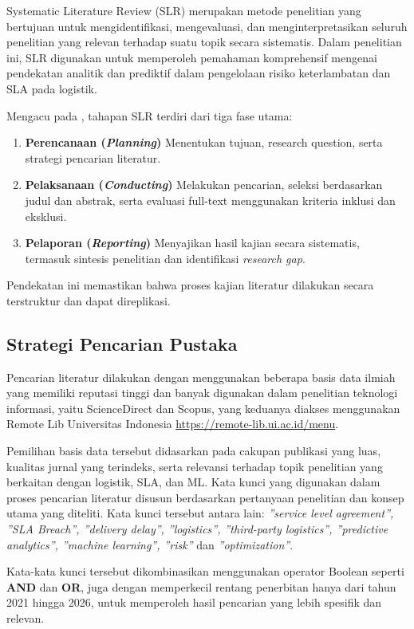 Systematic Literature Review (SLR) merupakan metode penelitian yang bertujuan untuk mengidentifikasi, mengevaluasi, dan menginterpretasikan seluruh penelitian yang relevan terhadap suatu topik secara sistematis. Dalam penelitian ini, SLR digunakan untuk memperoleh pemahaman komprehensif mengenai pendekatan analitik dan prediktif dalam pengelolaan risiko keterlambatan dan SLA pada logistik.

Mengacu pada \citep{kitchenham}, tahapan SLR terdiri dari tiga fase utama: 
\begin{enumerate}
    \item \textbf{Perencanaan (\textit{Planning})} Menentukan tujuan, research question, serta strategi pencarian literatur.
    \item \textbf{Pelaksanaan (\textit{Conducting})} Melakukan pencarian, seleksi berdasarkan judul dan abstrak, serta evaluasi full-text menggunakan kriteria inklusi dan eksklusi.
    \item \textbf{Pelaporan (\textit{Reporting})} Menyajikan hasil kajian secara sistematis, termasuk sintesis penelitian dan identifikasi \textit{research gap}.
\end{enumerate}

Pendekatan ini memastikan bahwa proses kajian literatur dilakukan secara terstruktur dan dapat direplikasi.

\subsection{Strategi Pencarian Pustaka}

Pencarian literatur dilakukan dengan menggunakan beberapa basis data ilmiah yang memiliki reputasi tinggi dan banyak digunakan dalam penelitian teknologi informasi, yaitu ScienceDirect dan Scopus, yang keduanya diakses menggunakan Remote Lib Universitas Indonesia \url{https://remote-lib.ui.ac.id/menu}.

Pemilihan basis data tersebut didasarkan pada cakupan publikasi yang luas, kualitas jurnal yang terindeks, serta relevansi terhadap topik penelitian yang berkaitan dengan logistik, SLA, dan ML. Kata kunci yang digunakan dalam proses pencarian literatur disusun berdasarkan pertanyaan penelitian dan konsep utama yang diteliti. Kata kunci tersebut antara lain: \textit{”service level agreement”, ”SLA Breach”, ”delivery delay”, ”logistics”, ”third-party logistics”, ”predictive analytics”, ”machine learning”, ”risk”} dan \textit{”optimization”}. 

Kata-kata kunci tersebut dikombinasikan menggunakan operator Boolean seperti \textbf{AND} dan \textbf{OR}, juga dengan memperkecil rentang penerbitan hanya dari tahun 2021 hingga 2026, untuk memperoleh hasil pencarian yang lebih spesifik dan relevan. 

